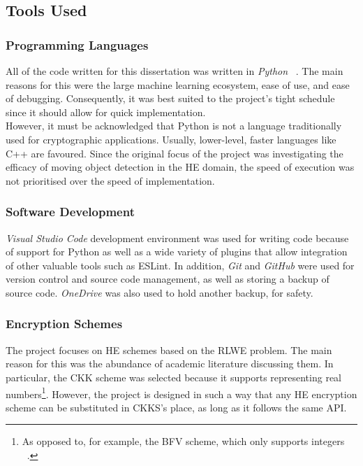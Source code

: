 \setlength{\leftskip}{0cm}

\subsection{Tools Used}
\subsubsection{Programming Languages}
\setlength{\leftskip}{0.5cm}
\indent \indent
All of the code written for this dissertation was written in \textit{Python} ~\cite{Python}.  The main reasons for this were the large machine learning ecosystem, ease of use, and ease of debugging. Consequently, it was best suited to the project's tight schedule since it should allow for quick implementation.
\smallskip \\ \indent
However, it must be acknowledged that Python is not a language traditionally used for cryptographic applications. Usually, lower-level, faster languages like C++ are favoured. Since the original focus of the project was investigating the efficacy of moving object detection in the HE domain, the speed of execution was not prioritised over the speed of implementation.

\setlength{\leftskip}{0cm}
\subsubsection{Software Development}
\setlength{\leftskip}{0.5cm}
\indent \indent
\textit{Visual Studio Code} \cite{VSCode} development environment was used for writing code because of support for Python as well as a wide variety of plugins that allow integration of other valuable tools such as ESLint.  In addition, \textit{Git} \cite{Git} and \textit{GitHub} \cite{Github} were used for version control and source code management, as well as storing a backup of source code. \textit{OneDrive} \cite{OneDrive} was also used to hold another backup, for safety.

\setlength{\leftskip}{0cm}
\subsubsection{Encryption Schemes}
\setlength{\leftskip}{0.5cm}
\indent \indent
The project focuses on HE schemes based on the RLWE problem. The main reason for this was the abundance of academic literature discussing them. In particular, the CKK scheme \cite{CKKS} was selected because it supports representing real numbers\footnote{As opposed to, for example, the BFV scheme, which only supports integers ~\cite{BFV1, BFV2}.}. However, the project is designed in such a way that any HE encryption scheme can be substituted in CKKS's place, as long as it follows the same API.


